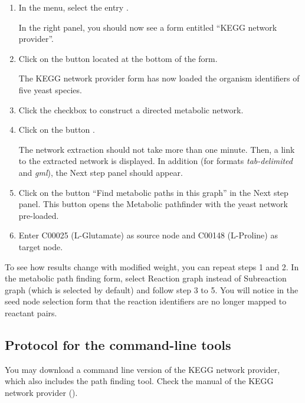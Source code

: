 \begin{enumerate}

\item In the \neat  menu, select the entry .

  In the right panel, you should now see a form entitled
  ``KEGG network provider''.

\item Click on the button  located at the bottom of the form.

  The KEGG network provider form has now loaded the organism identifiers of five yeast species.

\item Click the checkbox  to construct a directed metabolic network.

\item Click on the button .

  The network extraction should not take more than one minute.
  Then, a link to the extracted network is displayed.
  In addition (for formats \textit{tab-delimited} and \textit{gml}), the Next step panel should appear.

\item Click on the button ``Find metabolic paths in this graph'' in the Next step panel. This button opens the
Metabolic pathfinder with the yeast network pre-loaded.

\item Enter C00025 (L-Glutamate) as source node and C00148 (L-Proline) as target node.

\end{enumerate}

To see how results change with modified weight, you can repeat steps 1 and 2.
In the metabolic path finding form, select Reaction graph instead of Subreaction graph (which is selected by default) and
follow step 3 to 5. You will notice in the seed node selection form that the reaction identifiers are no longer mapped to
reactant pairs.

\subsection{Protocol for the command-line tools}

You may download a command line version of the KEGG network provider, which also includes the path finding tool.
Check the manual of the KEGG network provider (). \\

